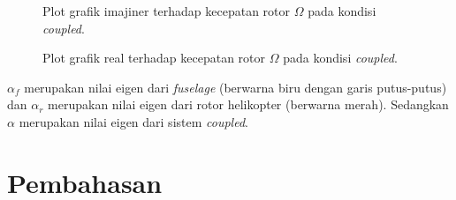 \begin{figure}[H]
	\centering
	\caption{Plot grafik imajiner terhadap kecepatan rotor $\Omega$ pada kondisi \textit{coupled}.}
	\label{fig:imag(coupled)}
\end{figure}

\begin{figure}[H]
	\centering
	\caption{Plot grafik real terhadap kecepatan rotor $\Omega$ pada kondisi \textit{coupled}.}
	\label{fig:real(coupled)}
\end{figure}

$\alpha_f$ merupakan nilai eigen dari \textit{fuselage} (berwarna biru dengan garis putus-putus) dan $\alpha_r$ merupakan nilai eigen dari rotor helikopter (berwarna merah). Sedangkan $\alpha$ merupakan nilai eigen dari sistem \textit{coupled}.

\section{Pembahasan}
\label{sec:pembahasan}
